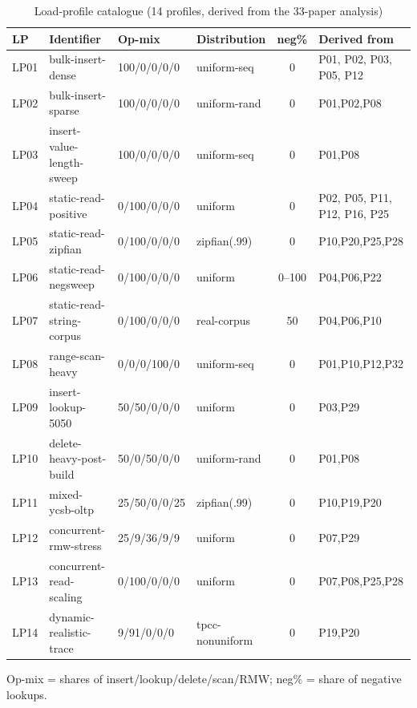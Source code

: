 \begin{table}[!htbp]
  \caption{Load-profile catalogue (14 profiles, derived from the 33-paper analysis)}\label{tab:lp-catalog}
  \centering\footnotesize
  \begin{tabular}{@{}l p{3.3cm} l l c p{2.4cm}@{}}
    \toprule
    \textbf{LP} & \textbf{Identifier} & \textbf{Op-mix} & \textbf{Distribution} & \textbf{neg\%} & \textbf{Derived from} \\
    \midrule
    LP01 & bulk-insert-dense & 100/0/0/0/0 & uniform-seq & 0 & P01, P02, P03, P05, P12 \\
    LP02 & bulk-insert-sparse & 100/0/0/0/0 & uniform-rand & 0 & P01,P02,P08 \\
    LP03 & insert-value-length-sweep & 100/0/0/0/0 & uniform-seq & 0 & P01,P08 \\
    LP04 & static-read-positive & 0/100/0/0/0 & uniform & 0 & P02, P05, P11, P12, P16, P25 \\
    LP05 & static-read-zipfian & 0/100/0/0/0 & zipfian(.99) & 0 & P10,P20,P25,P28 \\
    LP06 & static-read-negsweep & 0/100/0/0/0 & uniform & 0--100 & P04,P06,P22 \\
    LP07 & static-read-string-corpus & 0/100/0/0/0 & real-corpus & 50 & P04,P06,P10 \\
    LP08 & range-scan-heavy & 0/0/0/100/0 & uniform-seq & 0 & P01,P10,P12,P32 \\
    LP09 & insert-lookup-5050 & 50/50/0/0/0 & uniform & 0 & P03,P29 \\
    LP10 & delete-heavy-post-build & 50/0/50/0/0 & uniform-rand & 0 & P01,P08 \\
    LP11 & mixed-ycsb-oltp & 25/50/0/0/25 & zipfian(.99) & 0 & P10,P19,P20 \\
    LP12 & concurrent-rmw-stress & 25/9/36/9/9 & uniform & 0 & P07,P29 \\
    LP13 & concurrent-read-scaling & 0/100/0/0/0 & uniform & 0 & P07,P08,P25,P28 \\
    LP14 & dynamic-realistic-trace & 9/91/0/0/0 & tpcc-nonuniform & 0 & P19,P20 \\
    \bottomrule
  \end{tabular}

  \smallskip
  {\footnotesize Op-mix = shares of insert/lookup/delete/scan/RMW\@; neg\% = share of negative lookups.\par}
\end{table}

